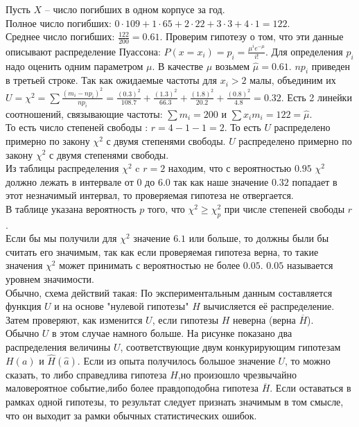 \documentclass[russian, 12pt, fleqn]{article}
\begin{document}
Пусть $X$ -- число погибших в одном корпусе за год.\\
Полное число погибших: $0\cdot 109 + 1 \cdot 65 + 2 \cdot 22 + 3 \cdot 3 + 4 \cdot 1=122$.\\
Среднее число погибших: $\frac{122}{200} = 0.61$. Проверим гипотезу о том, что эти данные описывают распределение Пуассона: $P(x = x_i) = p_i = \frac{\mu^ie^{-\mu}}{i!}$. Для определения $p_i$ надо оценить одним параметром $\mu$. В качестве $\mu$ возьмем $\hat{\mu} = 0.61$. $np_i$ приведен в третьей строке. Так как ожидаемые частоты для $x_i > 2$ малы, объединим их $U = \chi^2 = \displaystyle{\sum } \frac{(m_i - np_i)^2}{np_i} = \frac{(0.3)^2}{108.7} + \frac{(1.3)^2}{66.3} + \frac{(1.8)^2}{20.2} + \frac{(0.8)^2}{4.8} = 0.32$. Есть 2 линейки соотношений, связывающие частоты: $\displaystyle{\sum\limits} m_i = 200$ и $\displaystyle{\sum\limits} x_im_i = 122 = \hat{\mu}$.\\
То есть число степеней свободы : $r = 4 - 1 - 1 = 2$. То есть $U$ распределено примерно  по закону $\chi^2$ с двумя степенями свободы. $U$ распределено примерно по закону $\chi^2$ с двумя степенями свободы.\\
Из таблицы распределения $\chi^2$ c $r=2$ находим, что с вероятностью $0.95$ $\chi^2$ должно лежать в интервале от $0$ до $6.0$ так  как наше значение  $0.32$ попадает в этот незначимый интервал, то проверяемая гипотеза не отвергается.\\
В таблице указана вероятность $p$ того, что $\chi^2 \geq \chi^2_p$ при  числе степеней свободы $r$.\\
Если бы мы получили для $\chi^2$ значение $6.1$ или больше, то должны были бы считать  его значимым, так как если проверяемая гипотеза верна, то такие значения $\chi^2$ может принимать с вероятностью не более $0.05$. $0.05$ называется уровнем значимости.\\
Обычно, схема действий такая: По экспериментальным данным составляется функция $U$ и на основе "нулевой гипотезы" $H$ вычисляется её распределение. Затем проверяют, как изменится $U$, если гипотезы $H$ неверна (верна $\overline{H}$).\\ 
Обычно $U$ в этом случае намного больше. На рисунке показано два распределения величины $U$, соответствующие двум конкурирующим гипотезам $H(a)$ и $\hat{H}(\hat{a})$. Если из опыта получилось большое значение $U$, то можно сказать, то либо справедлива гипотеза $H$,но произошло чрезвычайно маловероятное событие,либо более правдоподобна гипотеза $\overline{H}$. Если оставаться в рамках одной гипотезы, то результат следует признать значимым в том смысле, что он выходит за рамки обычных статистических ошибок.\\
\end{document}
